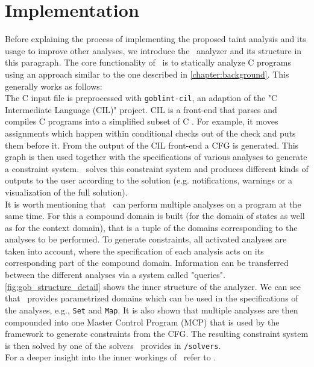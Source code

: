   \section{Implementation}\label{sec:implementation}
  Before explaining the process of implementing the proposed taint analysis and its usage to improve other analyses, we introduce the \gob\ analyzer and its structure in this paragraph. The core functionality of \gob\ is to statically analyze C programs using an approach similar to the one described in \autoref{chapter:background}. This generally works as follows:\\
  The C input file is preprocessed with \texttt{goblint-cil}, an adaption of the "C Intermediate Language (CIL)" project. CIL is a front-end that parses and compiles C programs into a simplified subset of C \parencite{goblintCil}. For example, it moves assignments which happen within conditional checks out of the check and puts them before it. From the output of the CIL front-end a \ac{CFG} is generated. This graph is then used together with the specifications of various analyses to generate a constraint system. \gob\ solves this constraint system and produces different kinds of outputs to the user according to the solution (e.g. notifications, warnings or a visualization of the full solution).\\
  It is worth mentioning that \gob\ can perform multiple analyses on a program at the same time. For this a compound domain is built (for the domain of states as well as for the context domain), that is a tuple of the domains corresponding to the analyses to be performed. To generate constraints, all activated analyses are taken into account, where the specification of each analysis acts on its corresponding part of the compound domain. Information can be transferred between the different analyses via a system called "queries".\\
  \autoref{fig:gob_structure_detail} shows the inner structure of the analyzer. We can see that \gob\ provides parametrized domains which can be used in the specifications of the analyses, e.g., \texttt{Set} and \texttt{Map}. It is also shown that multiple analyses are then compounded into one Master Control Program (MCP) that is used by the framework to generate constraints from the \ac{CFG}. The resulting constraint system is then solved by one of the solvers \gob\ provides in \texttt{/solvers}.\\  
  For a deeper insight into the inner workings of \gob\ refer to \parencite{apinis2014frameworks}.
  
